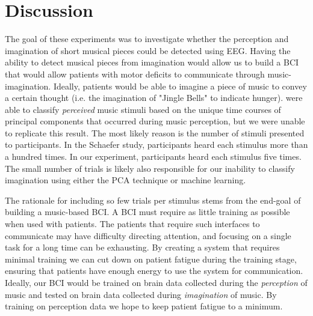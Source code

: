 \chapter{Discussion}
The goal of these experiments was to investigate whether the perception and imagination of short musical pieces could be detected using EEG.  
Having the ability to detect musical pieces from imagination would allow us to build a \ac{BCI} that would allow patients with motor deficits to communicate through music-imagination.
Ideally, patients would be able to imagine a piece of music to convey a certain thought (i.e. the imagination of "Jingle Bells" to indicate hunger).
\cite{schaefer_name_2011} were able to classify \emph{perceived} music stimuli based on the unique time courses of principal components that occurred during music perception, but we were unable to replicate this result. 
The most likely reason is the number of stimuli presented to participants. 
In the Schaefer study, participants heard each stimulus more than a hundred times. 
In our experiment, participants heard each stimulus five times. 
The small number of trials is likely also responsible for our inability to classify imagination using either the PCA technique or machine learning. 

The rationale for including so few trials per stimulus stems from the end-goal of building a music-based \ac{BCI}. 
A \ac{BCI} must require as little training as possible when used with patients.
The patients that require such interfaces to communicate may have difficulty directing attention, and focusing on a single task for a long time can be exhausting. 
By creating a system that requires minimal training we can cut down on patient fatigue during the training stage, ensuring that patients have enough energy to use the system for communication. 
Ideally, our \ac{BCI} would be trained on brain data collected during the \emph{perception} of music and tested on brain data collected during \emph{imagination} of music. 
By training on perception data we hope to keep patient fatigue to a minimum. 


